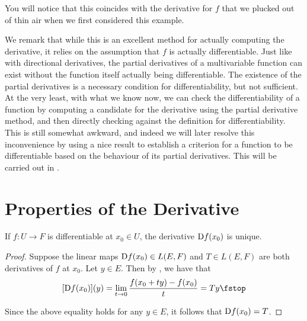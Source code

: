You will notice that this coincides with the derivative for \( f \) that we plucked out of thin air when we first considered this example.

\vspace{3mm}

We remark that while this is an excellent method for actually computing the derivative, it relies on the assumption that \( f \) is actually differentiable. Just like with directional derivatives, the partial derivatives of a multivariable function can exist without the function itself actually being differentiable. The existence of the partial derivatives is a necessary condition for differentiability, but not sufficient. At the very least, with what we know now, we can check the differentiability of a function by computing a candidate for the derivative using the partial derivative method, and then directly checking against the definition for differentiability. This is still somewhat awkward, and indeed we will later resolve this inconvenience by using a nice result to establish a criterion for a function to be differentiable based on the behaviour of its partial derivatives. This will be carried out in .

\section{Properties of the Derivative}
\begin{proposition}
  If \( f:U\to F \) is differentiable at \( x_0\in U \), the derivative \( \text{D} f(x_0) \) is unique.
\end{proposition}
\begin{proof}
  Suppose the linear maps \( \text{D} f(x_0)\in L(E,F) \) and \( T\in L(E,F) \) are both derivatives of \( f \) at \( x_0 \). Let \( y\in E \). Then by , we have that
  \[ [\D f(x_0)](y)=\lim_{t\to 0}\frac{f(x_0+ty)-f(x_0)}{t}=Ty\fstop \]

  Since the above equality holds for any \( y\in E \), it follows that \( \text{D} f(x_0)=T \).
\end{proof}


